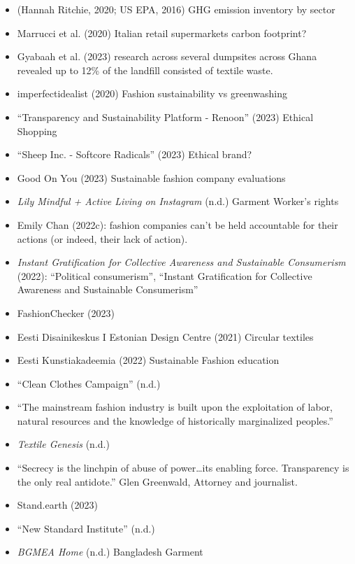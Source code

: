 \documentclass[
  letterpaper,
  DIV=11,
  numbers=noendperiod]{scrartcl}
\begin{document}
\begin{itemize}
\item
  (Hannah Ritchie, 2020; US EPA, 2016) GHG emission inventory by sector
\item
  Marrucci et al. (2020) Italian retail supermarkets carbon footprint?
\item
  Gyabaah et al. (2023) research across several dumpsites across Ghana
  revealed up to 12\% of the landfill consisted of textile waste.
\item
  imperfectidealist (2020) Fashion sustainability vs greenwashing
\item
  {``Transparency and Sustainability Platform - {Renoon}''} (2023)
  Ethical Shopping
\item
  {``Sheep {Inc}. - {Softcore Radicals}''} (2023) Ethical brand?
\item
  Good On You (2023) Sustainable fashion company evaluations
\item
  \emph{Lily {\textbar} Mindful + Active Living on {Instagram}} (n.d.)
  Garment Worker's rights
\item
  Emily Chan (2022c): fashion companies can't be held accountable for
  their actions (or indeed, their lack of action).
\item
  \emph{Instant {Gratification} for {Collective Awareness} and
  {Sustainable Consumerism}} (2022): ``Political consumerism'',
  ``Instant Gratification for Collective Awareness and Sustainable
  Consumerism''
\item
  FashionChecker (2023)
\item
  Eesti Disainikeskus I Estonian Design Centre (2021) Circular textiles
\item
  Eesti Kunstiakadeemia (2022) Sustainable Fashion education
\item
  {``Clean {Clothes Campaign}''} (n.d.)
\item
  ``The mainstream fashion industry is built upon the exploitation of
  labor, natural resources and the knowledge of historically
  marginalized peoples.''
\item
  \emph{Textile {Genesis}} (n.d.)
\item
  ``Secrecy is the linchpin of abuse of power\ldots its enabling force.
  Transparency is the only real antidote.'' Glen Greenwald, Attorney and
  journalist.
\item
  Stand.earth (2023)
\item
  {``New {Standard Institute}''} (n.d.)
\item
  \emph{{BGMEA} {\textbar} {Home}} (n.d.) Bangladesh Garment

\end{itemize}
\end{document}
